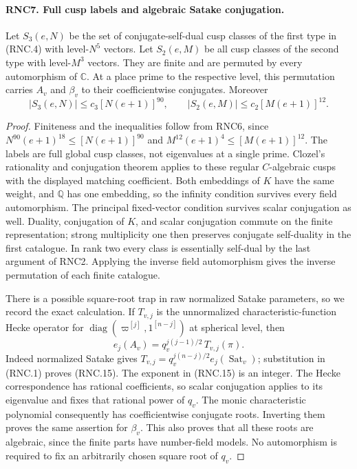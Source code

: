 \paragraph{RNC7. Full cusp labels and algebraic Satake conjugation.}
\label{claim:RNC7}
Let $S_3(e,N)$ be the set of conjugate-self-dual cusp classes
of the first type in (RNC.4) with level-$N^5$ vectors.
Let $S_2(e,M)$ be all cusp classes of the second type with
level-$M^3$ vectors.  They are finite and are permuted by
every automorphism of $\mathbb C$.  At a place prime to the
respective level, this permutation carries $A_v$ and
$\beta_v$ to their coefficientwise conjugates.  Moreover
\[
 |S_3(e,N)|\leq c_3[N(e+1)]^{90},\qquad
 |S_2(e,M)|\leq c_2[M(e+1)]^{12}.                              \tag{RNC.14}
\]
\begin{proof}
Finiteness and the inequalities follow from RNC6, since
$N^{90}(e+1)^{18}\leq[N(e+1)]^{90}$ and
$M^{12}(e+1)^4\leq[M(e+1)]^{12}$.
The labels are full global cusp classes, not eigenvalues
at a single prime.  Clozel's rationality and conjugation
theorem applies to these regular $C$-algebraic cusps with
the displayed matching coefficient.  Both embeddings of
$K$ have the same weight, and $\mathbb Q$ has one embedding,
so the infinity condition survives every field automorphism.
The principal fixed-vector condition survives scalar
conjugation as well.  Duality, conjugation of $K$, and
scalar conjugation commute on the finite representation;
strong multiplicity one then preserves conjugate
self-duality in the first catalogue.  In rank two every
class is essentially self-dual by the last argument of
RNC2.  Applying the inverse field automorphism gives the
inverse permutation of each finite catalogue.

There is a possible square-root trap in raw normalized
Satake parameters, so we record the exact calculation.
If $T_{v,j}$ is the unnormalized characteristic-function
Hecke operator for
$\operatorname{diag}(\varpi^{[j]},1^{[n-j]})$ at spherical
level, then
\[
       e_j(A_v)=q_v^{j(j-1)/2}\,T_{v,j}(\pi).                 \tag{RNC.15}
\]
Indeed normalized Satake gives
$T_{v,j}=q_v^{j(n-j)/2}e_j(\operatorname{Sat}_v)$;
substitution in (RNC.1) proves (RNC.15).  The exponent in
(RNC.15) is an integer.  The Hecke correspondence has
rational coefficients, so scalar conjugation applies to
its eigenvalue and fixes that rational power of $q_v$.
The monic characteristic polynomial consequently has
coefficientwise conjugate roots.  Inverting them proves
the same assertion for $\beta_v$.  This also proves that
all these roots are algebraic, since the finite parts have
number-field models.  No automorphism is required to fix
an arbitrarily chosen square root of $q_v$.
\end{proof}

